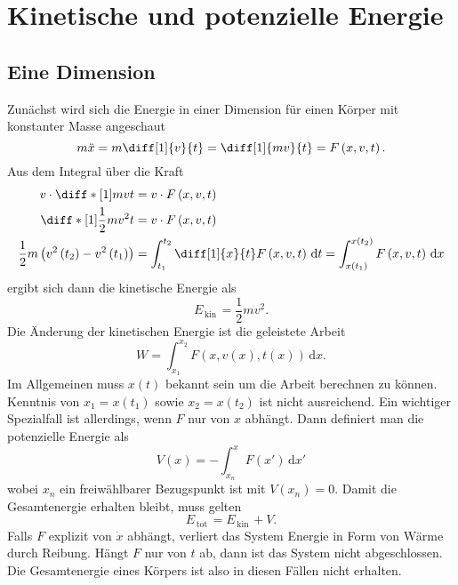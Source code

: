 \documentclass[a4paper,12pt]{article}
\newcommand{\td}{\,\text{d}}
\numberwithin{equation}{section}
\begin{document}
\newpage
\section{Kinetische und potenzielle Energie}
\subsection{Eine Dimension}
Zunächst wird sich die Energie in einer Dimension für einen Körper mit konstanter Masse angeschaut
\[ 
        m\ddot{x}=m \diff[1]{v}{t}=\diff[1]{mv}{t}=F\left(x,v,t\right)\\
.\] 
Aus dem Integral über die Kraft
\begin{align*}
        v\cdot \diff*[1]{mv}{t}&=v\cdot F\left(x,v,t\right)\\
        \diff*[1]{\dfrac{1}{2}mv^2}{t}&=v\cdot F\left(x,v,t\right)\\
        \dfrac{1}{2}m\left(v^2\left(t_2\right)-v^2\left(t_1\right)\right)&=\int_{t_1}^{t_2}\diff[1]{x}{t}F\left(x,v,t\right)\td t=\int_{x\left(t_1\right)}^{x\left(t_2\right)}F\left(x,v,t\right)\td x
\end{align*}
ergibt sich dann die kinetische Energie als
\[ 
        E_{\,\text{kin}\,}=\dfrac{1}{2}mv^2
.\] 
Die Änderung der kinetischen Energie ist die geleistete Arbeit
\[ 
        W=\int_{x_1}^{x_2}F\left(x,v\left(x\right),t\left(x\right)\right)\td x
.\] 
Im Allgemeinen muss $x\left(t\right)$ bekannt sein um die Arbeit berechnen zu können. Kenntnis von $x_1=x\left(t_1\right)$ sowie $x_2=x\left(t_2\right)$ ist nicht ausreichend. Ein wichtiger Spezialfall ist allerdings, wenn $F$ nur von $x$ abhängt. Dann definiert man die potenzielle Energie als
\[ 
        V\left(x\right)=-\int_{x_n}^{x}F\left(x'\right)\td x'
\] 
wobei $x_n$ ein freiwählbarer Bezugspunkt ist mit $V\left(x_n\right)=0$. Damit die Gesamtenergie erhalten bleibt, muss gelten
\[ 
        E_{\,\text{tot}\,}=E_{\,\text{kin}\,}+V
.\] 
Falls $F$ explizit von $\dot{x}$ abhängt, verliert das System Energie in Form von Wärme durch Reibung. Hängt $F$ nur von $t$ ab, dann ist das System nicht abgeschlossen. Die Gesamtenergie eines Körpers ist also in diesen Fällen nicht erhalten.
\end{document}
